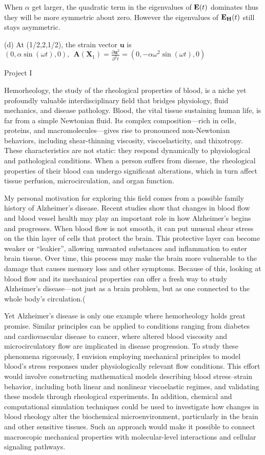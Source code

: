 \medskip
When $\alpha$ get larger, the quadratic term in the eigenvalues of $\mathbf{E}(t)$ dominates thus they will be more symmetric about zero. However the eigenvalues of $\mathbf{E_{\mathbf{H}}}(t)$ still stays asymmetric.

\medskip
(d) At (1/2,2,1/2), the strain vector $\bm{u}$ is $(0, \alpha\sin{(\omega t)}, 0),\  \ \bm{A}(\bm{X}_1)=\frac{\partial \bm{u}^2}{\partial^2 t} =(0, -\alpha\omega^2\sin{(\omega t)},0)$

\bigskip 
Project I 

\medskip
Hemorheology, the study of the rheological properties of blood, is a niche yet profoundly valuable interdisciplinary field that bridges physiology, fluid mechanics, and disease pathology. Blood, the vital tissue sustaining human life, is far from a simple Newtonian fluid. Its complex composition—rich in cells, proteins, and macromolecules—gives rise to pronounced non-Newtonian behaviors, including shear-thinning viscosity, viscoelasticity, and thixotropy. These characteristics are not static: they respond dynamically to physiological and pathological conditions. When a person suffers from disease, the rheological properties of their blood can undergo significant alterations, which in turn affect tissue perfusion, microcirculation, and organ function.

\medskip
My personal motivation for exploring this field comes from a possible family history of Alzheimer’s disease. Recent studies show that changes in blood flow and blood vessel health may play an important role in how Alzheimer’s begins and progresses. When blood flow is not smooth, it can put unusual shear stress on the thin layer of cells that protect the brain. This protective layer can become weaker or “leakier”, allowing unwanted substances and inflammation to enter brain tissue. Over time, this process may make the brain more vulnerable to the damage that causes memory loss and other symptoms. Because of this, looking at blood flow and its mechanical properties can offer a fresh way to study Alzheimer’s disease—not just as a brain problem, but as one connected to the whole body’s circulation.(\cite{chang2007hemorheological}

\medskip
Yet Alzheimer’s disease is only one example where hemorheology holds great promise. Similar principles can be applied to conditions ranging from diabetes and cardiovascular disease to cancer, where altered blood viscosity and microcirculatory flow are implicated in disease progression. To study these phenomena rigorously, I envision employing mechanical principles to model blood’s stress responses under physiologically relevant flow conditions. This effort would involve constructing mathematical models describing blood stress–strain behavior, including both linear and nonlinear viscoelastic regimes, and validating these models through rheological experiments. In addition, chemical and computational simulation techniques could be used to investigate how changes in blood rheology alter the biochemical microenvironment, particularly in the brain and other sensitive tissues. Such an approach would make it possible to connect macroscopic mechanical properties with molecular-level interactions and cellular signaling pathways.

